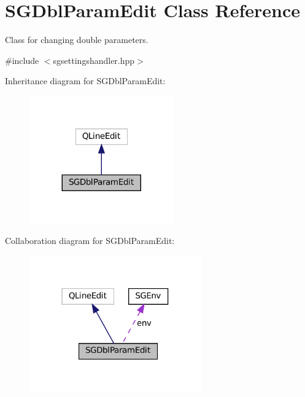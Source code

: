 \hypertarget{classSGDblParamEdit}{}\section{S\+G\+Dbl\+Param\+Edit Class Reference}
\label{classSGDblParamEdit}


Class for changing double parameters.  




{\ttfamily \#include $<$sgsettingshandler.\+hpp$>$}



Inheritance diagram for S\+G\+Dbl\+Param\+Edit\+:
\nopagebreak
\begin{figure}[H]
\begin{center}
\leavevmode
\includegraphics[width=176pt]{classSGDblParamEdit__inherit__graph}
\end{center}
\end{figure}


Collaboration diagram for S\+G\+Dbl\+Param\+Edit\+:
\nopagebreak
\begin{figure}[H]
\begin{center}
\leavevmode
\includegraphics[width=210pt]{classSGDblParamEdit__coll__graph}
\end{center}
\end{figure}
